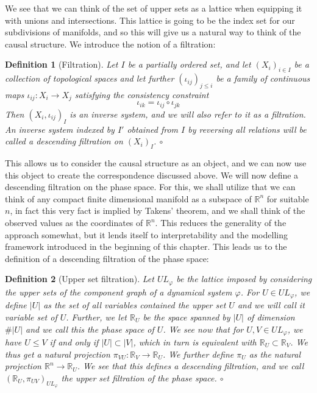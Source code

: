 \documentclass[11pt, a4paper]{memoir}
\theoremstyle{break}
\theoremstyle{break}
\newtheorem{innerdefn}{Definition}
\newenvironment{defn}
  {\begin{innerdefn}}
  {\ensuremath{\circ}\end{innerdefn}}
\theoremstyle{nonumberplain}
\newcommand{\mR}{\mathbb{R}}
\begin{document}
We see that we can think of the set of upper sets as a lattice when equipping it with unions and intersections. This lattice is going to be the index set for our subdivisions of manifolds, and so this will give us a natural way to think of the causal structure. We introduce the notion of a filtration:
\begin{defn}[Filtration]
Let $I$ be a partially ordered set, and let $(X_i)_{i\in I}$ be a collection of topological spaces and let further $(\iota_{ij})_{j\leqslant i}$ be a family of continuous maps $\iota_{ij}: X_i\to X_j$ satisfying the consistency constraint
$$\iota_{ik}=\iota_{ij}\circ \iota_{jk}$$
Then $(X_i,\iota_{ij})_I$ is an \emph{inverse system}, and we will also refer to it as a \emph{filtration}. An inverse system indexed by $I'$ obtained from $I$ by reversing all relations will be called a \emph{descending filtration} on $(X_i)_I$.
\end{defn}
This allows us to consider the causal structure as an object, and we can now use this object to create the correspondence discussed above. We will now define a descending filtration on the phase space. For this, we shall utilize that we can think of any compact finite dimensional manifold as a subspace of $\mR^n$ for suitable $n$, in fact this very fact is implied by Takens' theorem, and we shall think of the observed values as the coordinates of $\mR^n$. This reduces the generality of the approach somewhat, but it lends itself to interpretability and the modelling framework introduced in the beginning of this chapter. This leads us to the definition of a descending filtration of the phase space:
\begin{defn}[Upper set filtration]
Let $UL_\varphi$ be the lattice imposed by considering the upper sets of the component graph of a dynamical system $\varphi$. For $U\in UL_\varphi$, we define $|U|$ as the set of all variables contained the upper set $U$ and we will call it \textit{variable set} of $U$. Further, we let $\mR_U$ be the space spanned by $|U|$ of dimension $\#|U|$ and we call this the \textit{phase space} of $U$. We see now that for $U,V\in UL_\varphi$, we have $U\leqslant V$ if and only if $|U|\subset |V|$, which in turn is equivalent with $\mR_U\subset \mR_V$. We thus get a natural projection $\pi_{VU}:\mR_V\to\mR_U$. We further define $\pi_U$ as the natural projection $\mR^n\to \mR_U$. We see that this defines a descending filtration, and we call $(\mR_U,\pi_{UV})_{UL_\varphi}$ the \emph{upper set filtration of the phase space}.
\end{defn} 
\end{document}
